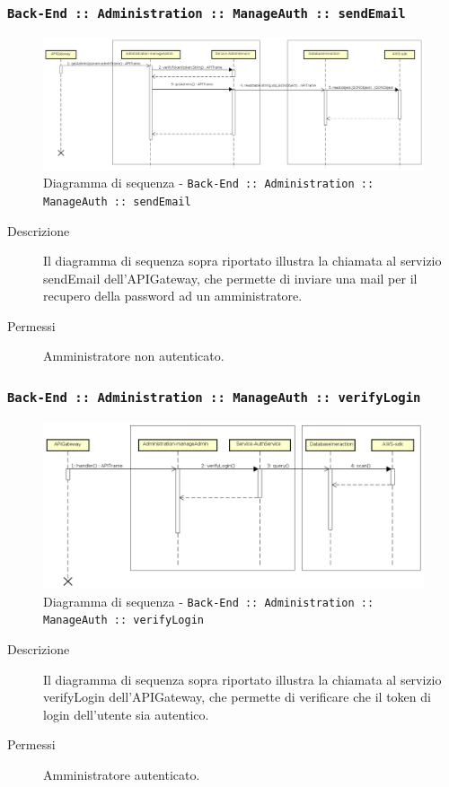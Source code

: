 \documentclass[../DefinizioneDiProdotto_v3.0.0.tex]{subfiles}
\begin{document}
\newpage
\subsubsection{\texttt{Back-End :: Administration :: ManageAuth :: sendEmail}}
\begin{figure}[!h]
	\centering
	\includegraphics[width=\textwidth]{DiagrammiSequenza/Back-End/manageAuth/sendEmail.png}
	\caption{Diagramma di sequenza - \texttt{Back-End :: Administration :: ManageAuth :: sendEmail }}
\end{figure}
\begin{description}
	\item [Descrizione] Il diagramma di sequenza sopra riportato illustra la chiamata al servizio sendEmail dell'APIGateway, che permette di inviare una mail per il recupero della password ad un amministratore.
	\item [Permessi] Amministratore non autenticato.
\end{description}

\subsubsection{\texttt{Back-End :: Administration :: ManageAuth :: verifyLogin}}
\begin{figure}[!h]
	\centering
	\includegraphics[width=\textwidth]{DiagrammiSequenza/Back-End/manageAuth/verifyLogin.png}
	\caption{Diagramma di sequenza - \texttt{Back-End :: Administration :: ManageAuth :: verifyLogin }}
\end{figure}
\begin{description}
	\item [Descrizione] Il diagramma di sequenza sopra riportato illustra la chiamata al servizio verifyLogin dell'APIGateway, che permette di verificare che il token di login dell'utente sia autentico.
	\item [Permessi] Amministratore autenticato.
\end{description}
\end{document}
